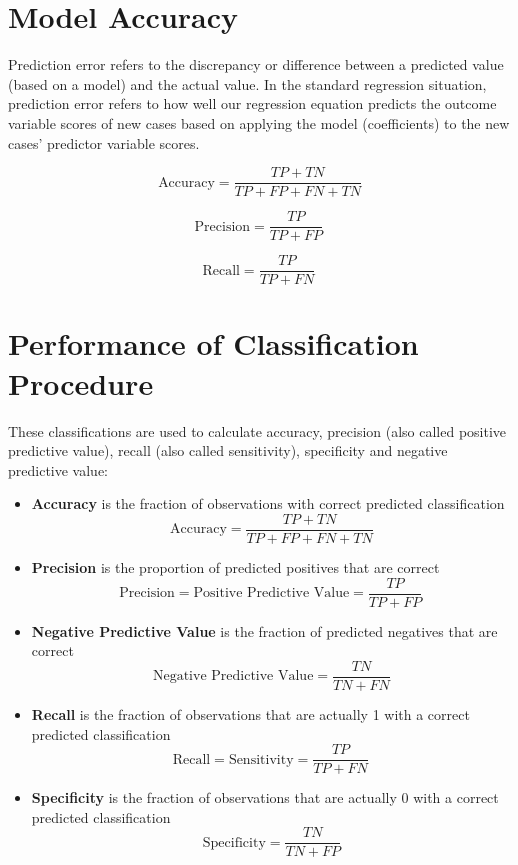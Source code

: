 \documentclass[a4paper,12pt]{article}
\begin{document}
\section{Model Accuracy}
Prediction error refers to the discrepancy or difference between a predicted value (based on a
model) and the actual value. In the standard regression situation, prediction error refers to how
well our regression equation predicts the outcome variable scores of new cases based on
applying the model (coefficients) to the new cases’ predictor variable scores.

\begin{equation}
\text{Accuracy}=\frac{TP+TN}{TP+FP+FN+TN}
\end{equation}

\begin{equation}
\text{Precision}=\frac{TP}{TP+FP} \, 
\end{equation}

\begin{equation}
\text{Recall}=\frac{TP}{TP+FN} \, 
\end{equation}

	\section{Performance of Classification Procedure}
	
	These classifications are used to calculate accuracy, precision (also called positive predictive value), recall (also called sensitivity), specificity and negative predictive value:
	
	\begin{itemize}
		\item  \textbf{Accuracy} is the fraction of observations with correct predicted classification
		\[ \mbox{Accuracy}=\frac{TP+TN}{TP+FP+FN+TN}\]
		
		
		\item \textbf{Precision} is the proportion of predicted positives that are correct
		\[
		\mbox{Precision} = \mbox{Positive Predictive Value} =\frac{TP}{TP+FP} \, \]
		
		\item \textbf{Negative Predictive Value} is the  fraction of predicted negatives that are correct
		\[\mbox{Negative Predictive Value} = \frac{TN}{TN+FN}\]
		
		\item \textbf{Recall} is the fraction of observations that are actually 1 with a correct predicted classification
		\[ 
		\mbox{Recall} = \mbox{Sensitivity} = \frac{TP}{TP+FN} \,  \]
		
		\item \textbf{Specificity} is the fraction of observations that are actually 0 with a correct predicted classification
		\[ \mbox{Specificity} = \frac{TN}{TN+FP} \]
		
	\end{itemize}
\end{document}
